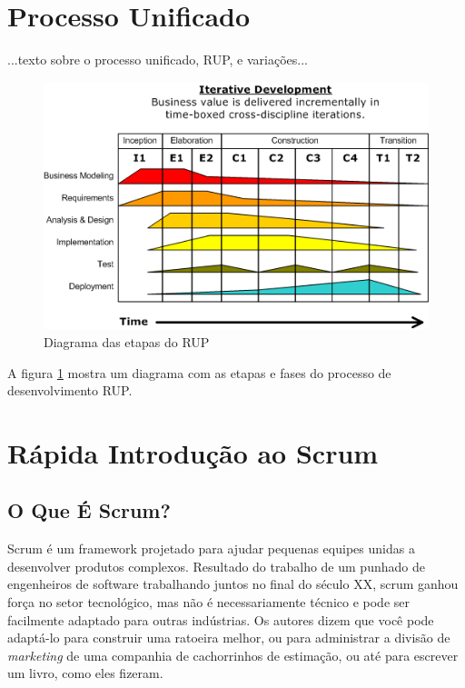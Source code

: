 \documentclass[
	11pt,				%
	openright,
	twoside,			%
	a4paper,			%
	english,			%
	french,
	brazil,				%
	sumario=tradicional
	]{abntex2}
\begin{document}
\section{Processo Unificado}

...texto sobre o processo unificado, RUP, e variações...
\begin{figure}[ht]
\begin{center}
\includegraphics[scale=0.6]{File_Development-iterative-RUP-wiki.png}
\caption{Diagrama das etapas do RUP} \label{fig:rup}
\end{center}
\end{figure}
A figura \ref{fig:rup} mostra um diagrama com as etapas e fases do processo de desenvolvimento RUP.

\section{Rápida Introdução ao Scrum}

\subsection{O Que É Scrum?}
Scrum é um framework projetado para ajudar pequenas equipes unidas a desenvolver produtos complexos. Resultado do trabalho de um punhado de engenheiros de software trabalhando juntos no final do século XX, scrum ganhou força no setor tecnológico, mas não é necessariamente técnico e pode ser facilmente adaptado para outras indústrias. Os autores  dizem que você pode adaptá-lo para construir uma ratoeira melhor, ou para administrar a divisão de \textit{marketing} de uma companhia de cachorrinhos de estimação, ou até para escrever um livro, como eles fizeram.
\end{document}

